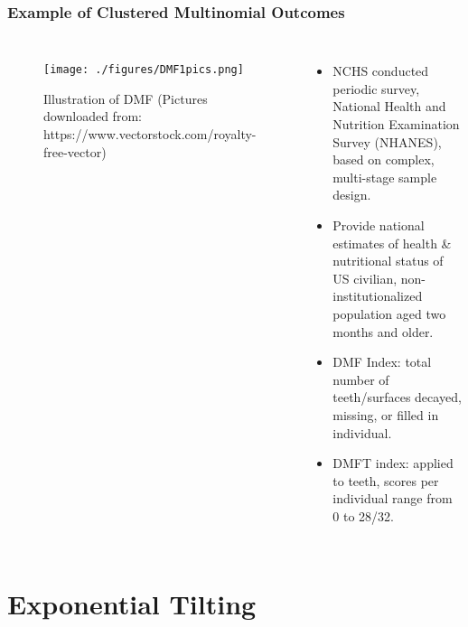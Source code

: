 \documentclass[hyperref={bookmarks=false},aspectratio=169]{beamer}
\begin{document}
\begin{frame}
\frametitle{Example of Clustered Multinomial Outcomes}

\begin{columns}


\begin{figure}
    \centering
    \texttt{[image: ./figures/DMF1pics.png]}
    \caption{Illustration of DMF \newline \tiny{(Pictures downloaded from: https://www.vectorstock.com/royalty-free-vector)}}
    \label{fig:toothDMF1Left}
\end{figure}

\begin{itemize}
    \item NCHS conducted periodic survey, National Health and Nutrition Examination Survey (NHANES), based on complex, multi-stage sample design.
    \item Provide national estimates of health {\&} nutritional status of US civilian, non-institutionalized population aged two months and older.
    \item DMF Index: total number of teeth/surfaces decayed, missing, or filled in individual.
    \item DMFT index: applied to teeth, scores per individual range from 0 to 28/32.
\end{itemize}

\end{columns}
\end{frame}



\section{Exponential Tilting}
\end{document}
